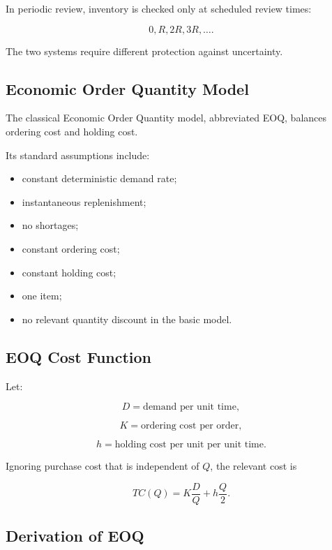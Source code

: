 In periodic review, inventory is checked only at scheduled review times:

\[
\boxed{
0,R,2R,3R,\ldots.
}
\]

The two systems require different protection against uncertainty.

\subsection{Economic Order Quantity Model}
\label{subsec:economic-order-quantity}

The classical Economic Order Quantity model, abbreviated EOQ, balances
ordering cost and holding cost.

Its standard assumptions include:

\begin{itemize}
    \item constant deterministic demand rate;
    \item instantaneous replenishment;
    \item no shortages;
    \item constant ordering cost;
    \item constant holding cost;
    \item one item;
    \item no relevant quantity discount in the basic model.
\end{itemize}

\subsection{EOQ Cost Function}
\label{subsec:eoq-cost-function}

Let:

\[
D
=
\text{demand per unit time},
\]

\[
K
=
\text{ordering cost per order},
\]

\[
h
=
\text{holding cost per unit per unit time}.
\]

Ignoring purchase cost that is independent of \(Q\), the relevant cost is

\[
\boxed{
TC(Q)
=
K\frac{D}{Q}
+
h\frac{Q}{2}.
}
\]

\subsection{Derivation of EOQ}
\label{subsec:eoq-derivation}

